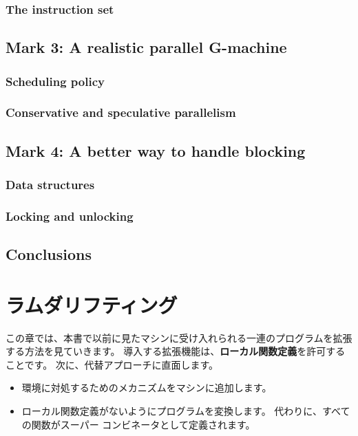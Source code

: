 \documentclass{jarticle}
\begin{document}
\subsubsection{The instruction set}
\newpage

\subsection{Mark 3: A realistic parallel G-machine}
\subsubsection{Scheduling policy}
\subsubsection{Conservative and speculative parallelism}
\newpage

\subsection{Mark 4: A better way to handle blocking}
\subsubsection{Data structures}
\subsubsection{Locking and unlocking}
\newpage

\subsection{Conclusions}
\newpage

\section{ラムダリフティング}

この章では、本書で以前に見たマシンに受け入れられる一連のプログラムを拡張する方法を見ていきます。
導入する拡張機能は、\textbf{ローカル関数定義}を許可することです。
次に、代替アプローチに直面します。

\begin{itemize}
	\item 環境に対処するためのメカニズムをマシンに追加します。
	\item ローカル関数定義がないようにプログラムを変換します。
	      代わりに、すべての関数がスーパー コンビネータとして定義されます。
\end{itemize}
\end{document}
